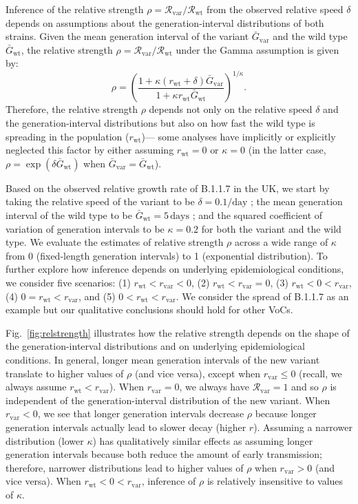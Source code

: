 \documentclass[12pt]{article}
\newcommand{\fref}[1]{Fig.~\ref{fig:#1}}
\newcommand{\vvvar}{\mathrm{var}}
\newcommand{\wwwt}{\mathrm{wt}}
\newcommand{\rx}[1]{\ensuremath{{r}_{#1}}\xspace}
\newcommand{\rw}{\rx{\wwwt}}
\newcommand{\rv}{\rx{\vvvar}}
\newcommand{\Rx}[1]{\ensuremath{{\mathcal R}_{#1}}\xspace}
\newcommand{\Rw}{\Rx{\wwwt}}
\newcommand{\Rv}{\Rx{\vvvar}}
\newcommand{\days}{\ensuremath{\, \textrm{days}}}
\newcommand{\pday}{\ensuremath{/\textrm{day}}}
\newcommand{\Gx}[1]{\ensuremath{{\bar G}_{#1}}\xspace}
\newcommand{\Gw}{\Gx{\wwwt}}
\newcommand{\Gv}{\Gx{\vvvar}}
\begin{document}
Inference of the relative strength $\rho = \Rv/\Rw$ from the observed relative speed $\delta$ depends on assumptions about the generation-interval distributions of both strains.
Given the mean generation interval of the variant $\Gv$ and the wild type $\Gw$, the relative strength $\rho = \Rv/\Rw$ under the Gamma assumption \citep{park2019practical} is given by:
\begin{equation}
\rho = \left(\frac{1 + \kappa (\rw + \delta) \Gv}{1 + \kappa \rw \Gw}\right)^{1/\kappa}.
\end{equation}
Therefore, the relative strength $\rho$ depends not only on the relative speed $\delta$ and the generation-interval distributions but also on how fast the wild type is spreading in the population (\rw)---
some analyses have implicitly or explicitly neglected this factor by either assuming $\rw = 0$ \citep{switzerland2021variant} or $\kappa = 0$ \citep{davies2021estimated} (in the latter case, $\rho = \exp(\delta \Gw)$ when $\Gv=\Gw$).

Based on the observed relative growth rate of B.1.1.7 in the UK, we start by  taking the relative speed of the variant to be $\delta = 0.1\pday$  \citep{davies2021estimated}; the mean generation interval of the wild type to be $\Gw = 5\days$ \citep{ferretti2020quantifying}; and the squared coefficient of variation of generation intervals to be $\kappa=0.2$ \citep{ferretti2020quantifying} for both the variant and the wild type.
We evaluate the estimates of relative strength $\rho$ across a wide range of $\kappa$ from 0 (fixed-length generation intervals) to 1 (exponential distribution).
To further explore how inference depends on underlying epidemiological conditions, we consider five scenarios: (1) $\rw < \rv < 0$, (2) $\rw < \rv = 0$, (3) $\rw < 0 < \rv$, (4) $0 = \rw < \rv$, and (5) $0 < \rw < \rv$.
We consider the spread of B.1.1.7 as an example but our qualitative conclusions should hold for other VoCs.

\fref{relstrength} illustrates how the relative strength depends on the shape of the generation-interval distributions and on underlying epidemiological conditions.
In general, longer mean generation intervals of the new variant translate to higher values of $\rho$ (and vice versa), except when $\rv \leq 0$ (recall, we always assume $\rw<\rv$).
When $\rv = 0$, we always have $\Rv = 1$ and so $\rho$ is independent of the generation-interval distribution of the new variant.
When $\rv < 0$, we see that longer generation intervals decrease $\rho$ because longer generation intervals actually lead to slower decay (higher $r$).
Assuming a narrower distribution (lower $\kappa$) has qualitatively similar effects as assuming longer generation intervals because both reduce the amount of early transmission; 
therefore, narrower distributions lead to higher values of $\rho$ when $\rv > 0$ (and vice versa).
When $\rw < 0 < \rv$, inference of $\rho$ is relatively insensitive to values of $\kappa$.
\end{document}
